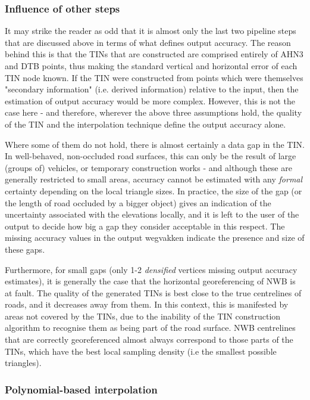 \subsubsection{Influence of other steps}

It may strike the reader as odd that it is almost only the last two pipeline steps that are discussed above in terms of what defines output accuracy. The reason behind this is that the TINs that are constructed are comprised entirely of AHN3 and DTB points, thus making the standard vertical and horizontal error of each TIN node known. If the TIN were constructed from points which were themselves "secondary information" (i.e. derived information) relative to the input, then the estimation of output accuracy would be more complex. However, this is not the case here - and therefore, wherever the above three assumptions hold, the quality of the TIN and the interpolation technique define the output accuracy alone.

Where some of them do not hold, there is almost certainly a data gap in the TIN. In well-behaved, non-occluded road surfaces, this can only be the result of large (groups of) vehicles, or temporary construction works - and although these are generally restricted to small areas, accuracy cannot be estimated with any \textit{formal} certainty depending on the local triangle sizes. In practice, the size of the gap (or the length of road occluded by a bigger object) gives an indication of the uncertainty associated with the elevations locally, and it is left to the user of the output to decide how big a gap they consider acceptable in this respect. The missing accuracy values in the output wegvakken indicate the presence and size of these gaps.

Furthermore, for small gaps (only 1-2 \textit{densified} vertices missing output accuracy estimates), it is generally the case that the horizontal georeferencing of NWB is at fault. The quality of the generated TINs is best close to the true centrelines of roads, and it decreases away from them. In this context, this is manifested by areas not covered by the TINs, due to the inability of the TIN construction algorithm to recognise them as being part of the road surface. NWB centrelines that are correctly georeferenced almost always correspond to those parts of the TINs, which have the best local sampling density (i.e the smallest possible triangles).

\subsubsection{Polynomial-based interpolation}


